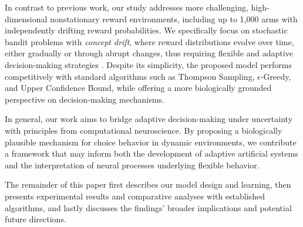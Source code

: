 In contrast to previous work, our study addresses more challenging, high-dimensional nonstationary reward environments, including up to 1,000 arms with independently drifting reward probabilities.
We specifically focus on stochastic bandit problems with \textit{concept drift}, where reward distributions evolve over time, either gradually or through abrupt changes, thus requiring flexible and adaptive decision-making strategies \cite{garivierUpperConfidenceBoundPolicies2008, besbesStochasticMultiArmedBanditProblem2014, cavenaghiNonStationaryMultiArmed2021}.
Despite its simplicity, the proposed model performs competitively with standard algorithms such as Thompson Sampling, $\epsilon$-Greedy, and Upper Confidence Bound, while offering a more biologically grounded perspective on decision-making mechanisms.

In general, our work aims to bridge adaptive decision-making under uncertainty with principles from computational neuroscience.
By proposing a biologically plausible mechanism for choice behavior in dynamic environments, we contribute a framework that may inform both the development of adaptive artificial systems and the interpretation of neural processes underlying flexible behavior.

\hfill \break
The remainder of this paper first describes our model design and learning, then presents experimental results and comparative analyses with established algorithms, and lastly discusses the findings' broader implications and potential future directions.






